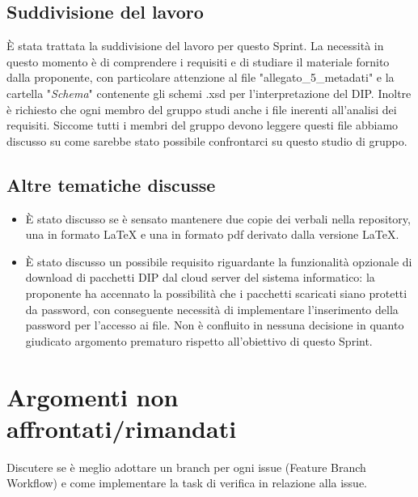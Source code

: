 \documentclass[a4paper,12pt]{article}
\begin{document}
\subsection{Suddivisione del lavoro}
È stata trattata la suddivisione del lavoro per questo Sprint. La necessità in questo momento è di comprendere i requisiti e di studiare il materiale fornito dalla proponente, con particolare attenzione al file "allegato\_5\_metadati" e la cartella "\textit{Schema}" contenente gli schemi .xsd per l'interpretazione del DIP. Inoltre è richiesto che ogni membro del gruppo studi anche i file inerenti all'analisi dei requisiti. Siccome tutti i membri del gruppo devono leggere questi file abbiamo discusso su come sarebbe stato possibile confrontarci su questo studio di gruppo. 

\subsection{Altre tematiche discusse}
\begin{itemize}[noitemsep]
    \item È stato discusso se è sensato mantenere due copie dei verbali nella repository, una in formato \LaTeX{} e una in formato pdf derivato dalla versione \LaTeX{}.
    \item È stato discusso un possibile requisito riguardante la funzionalità opzionale di download di pacchetti DIP dal cloud server del sistema informatico: la proponente ha accennato la possibilità che i pacchetti scaricati siano protetti da password, con conseguente necessità di implementare l'inserimento della password per l'accesso ai file. Non è confluito in nessuna decisione in quanto giudicato argomento prematuro rispetto all'obiettivo di questo Sprint.
\end{itemize}

\section{Argomenti non affrontati/rimandati}
Discutere se è meglio adottare un branch per ogni issue (Feature Branch Workflow) e come implementare la task di verifica in relazione alla issue.
\end{document}

